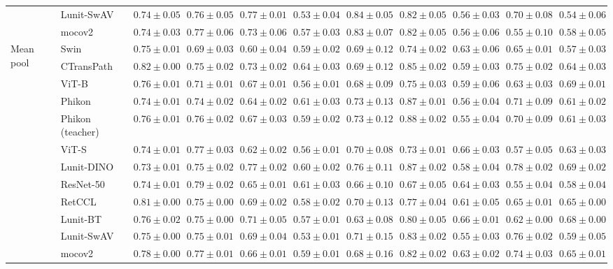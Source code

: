 \begin{tabular}{ll|cccc|c|cccc}
 & Lunit-SwAV & $0.74 \pm 0.05$ & $0.76 \pm 0.05$ & $0.77 \pm 0.01$ & $0.53 \pm 0.04$ & $0.84 \pm 0.05$ & $0.82 \pm 0.05$ & $0.56 \pm 0.03$ & $0.70 \pm 0.08$ & $0.54 \pm 0.06$ \\
 & mocov2 & $0.74 \pm 0.03$ & $0.77 \pm 0.06$ & $0.73 \pm 0.06$ & $0.57 \pm 0.03$ & $0.83 \pm 0.07$ & $0.82 \pm 0.05$ & $0.56 \pm 0.06$ & $0.55 \pm 0.10$ & $0.58 \pm 0.05$ \\
\cline{1-11}
\multirow[t]{12}{*}{Mean pool} & Swin & $0.75 \pm 0.01$ & $0.69 \pm 0.03$ & $0.60 \pm 0.04$ & $0.59 \pm 0.02$ & $0.69 \pm 0.12$ & $0.74 \pm 0.02$ & $0.63 \pm 0.06$ & $0.65 \pm 0.01$ & $0.57 \pm 0.03$ \\
 & CTransPath & $\mathbf{0.82 \pm 0.00}$ & $0.75 \pm 0.02$ & $0.73 \pm 0.02$ & $\mathbf{0.64 \pm 0.03}$ & $0.69 \pm 0.12$ & $0.85 \pm 0.02$ & $0.59 \pm 0.03$ & $0.75 \pm 0.02$ & $0.64 \pm 0.03$ \\
 & ViT-B & $0.76 \pm 0.01$ & $0.71 \pm 0.01$ & $0.67 \pm 0.01$ & $0.56 \pm 0.01$ & $0.68 \pm 0.09$ & $0.75 \pm 0.03$ & $0.59 \pm 0.06$ & $0.63 \pm 0.03$ & $\mathbf{0.69 \pm 0.01}$ \\
 & Phikon & $0.74 \pm 0.01$ & $0.74 \pm 0.02$ & $0.64 \pm 0.02$ & $0.61 \pm 0.03$ & $0.73 \pm 0.13$ & $0.87 \pm 0.01$ & $0.56 \pm 0.04$ & $0.71 \pm 0.09$ & $0.61 \pm 0.02$ \\
 & Phikon (teacher) & $0.76 \pm 0.01$ & $0.76 \pm 0.02$ & $0.67 \pm 0.03$ & $0.59 \pm 0.02$ & $0.73 \pm 0.12$ & $\mathbf{0.88 \pm 0.02}$ & $0.55 \pm 0.04$ & $0.70 \pm 0.09$ & $0.61 \pm 0.03$ \\
 & ViT-S & $0.74 \pm 0.01$ & $0.77 \pm 0.03$ & $0.62 \pm 0.02$ & $0.56 \pm 0.01$ & $0.70 \pm 0.08$ & $0.73 \pm 0.01$ & $\mathbf{0.66 \pm 0.03}$ & $0.57 \pm 0.05$ & $0.63 \pm 0.03$ \\
 & Lunit-DINO & $0.73 \pm 0.01$ & $0.75 \pm 0.02$ & $\mathbf{0.77 \pm 0.02}$ & $0.60 \pm 0.02$ & $\mathbf{0.76 \pm 0.11}$ & $0.87 \pm 0.02$ & $0.58 \pm 0.04$ & $\mathbf{0.78 \pm 0.02}$ & $0.69 \pm 0.02$ \\
 & ResNet-50 & $0.74 \pm 0.01$ & $\mathbf{0.79 \pm 0.02}$ & $0.65 \pm 0.01$ & $0.61 \pm 0.03$ & $0.66 \pm 0.10$ & $0.67 \pm 0.05$ & $0.64 \pm 0.03$ & $0.55 \pm 0.04$ & $0.58 \pm 0.04$ \\
 & RetCCL & $0.81 \pm 0.00$ & $0.75 \pm 0.00$ & $0.69 \pm 0.02$ & $0.58 \pm 0.02$ & $0.70 \pm 0.13$ & $0.77 \pm 0.04$ & $0.61 \pm 0.05$ & $0.65 \pm 0.01$ & $0.65 \pm 0.00$ \\
 & Lunit-BT & $0.76 \pm 0.02$ & $0.75 \pm 0.00$ & $0.71 \pm 0.05$ & $0.57 \pm 0.01$ & $0.63 \pm 0.08$ & $0.80 \pm 0.05$ & $0.66 \pm 0.01$ & $0.62 \pm 0.00$ & $0.68 \pm 0.00$ \\
 & Lunit-SwAV & $0.75 \pm 0.00$ & $0.75 \pm 0.01$ & $0.69 \pm 0.04$ & $0.53 \pm 0.01$ & $0.71 \pm 0.15$ & $0.83 \pm 0.02$ & $0.55 \pm 0.03$ & $0.76 \pm 0.02$ & $0.59 \pm 0.05$ \\
 & mocov2 & $0.78 \pm 0.00$ & $0.77 \pm 0.01$ & $0.66 \pm 0.01$ & $0.59 \pm 0.01$ & $0.68 \pm 0.16$ & $0.82 \pm 0.02$ & $0.63 \pm 0.02$ & $0.74 \pm 0.03$ & $0.65 \pm 0.01$ \\
\cline{1-11}
\bottomrule
\end{tabular}
